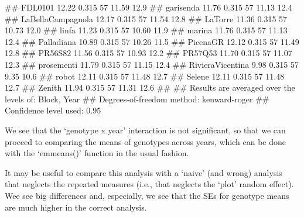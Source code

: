\documentclass[a4paper,12pt,oneside]{book}
\newenvironment{Shaded}{\begin{snugshade}}{\end{snugshade}}
\newcommand{\DocumentationTok}[1]{#1}
\begin{document}
\begin{Shaded}
\begin{Highlighting}[]
\DocumentationTok{\#\#  FDL0101            12.22 0.315 57    11.59     12.9}
\DocumentationTok{\#\#  garisenda          11.76 0.315 57    11.13     12.4}
\DocumentationTok{\#\#  LaBellaCampagnola  12.17 0.315 57    11.54     12.8}
\DocumentationTok{\#\#  LaTorre            11.36 0.315 57    10.73     12.0}
\DocumentationTok{\#\#  linfa              11.23 0.315 57    10.60     11.9}
\DocumentationTok{\#\#  marina             11.76 0.315 57    11.13     12.4}
\DocumentationTok{\#\#  Palladiana         10.89 0.315 57    10.26     11.5}
\DocumentationTok{\#\#  PicenaGR           12.12 0.315 57    11.49     12.8}
\DocumentationTok{\#\#  PR56S82            11.56 0.315 57    10.93     12.2}
\DocumentationTok{\#\#  PR57Q53            11.70 0.315 57    11.07     12.3}
\DocumentationTok{\#\#  prosementi         11.79 0.315 57    11.15     12.4}
\DocumentationTok{\#\#  RivieraVicentina    9.98 0.315 57     9.35     10.6}
\DocumentationTok{\#\#  robot              12.11 0.315 57    11.48     12.7}
\DocumentationTok{\#\#  Selene             12.11 0.315 57    11.48     12.7}
\DocumentationTok{\#\#  Zenith             11.94 0.315 57    11.31     12.6}
\DocumentationTok{\#\# }
\DocumentationTok{\#\# Results are averaged over the levels of: Block, Year }
\DocumentationTok{\#\# Degrees{-}of{-}freedom method: kenward{-}roger }
\DocumentationTok{\#\# Confidence level used: 0.95}
\end{Highlighting}
\end{Shaded}

We see that the `genotype x year' interaction is not significant, so that we can proceed to comparing the means of genotypes across years, which can be done with the `emmeans()' function in the usual fashion.

It may be useful to compare this analysis with a `naive' (and wrong) analysis that neglects the repeated measures (i.e., that neglects the `plot' random effect). Wee see big differences and, especially, we see that the SEs for genotype means are much higher in the correct analysis.
\end{document}
